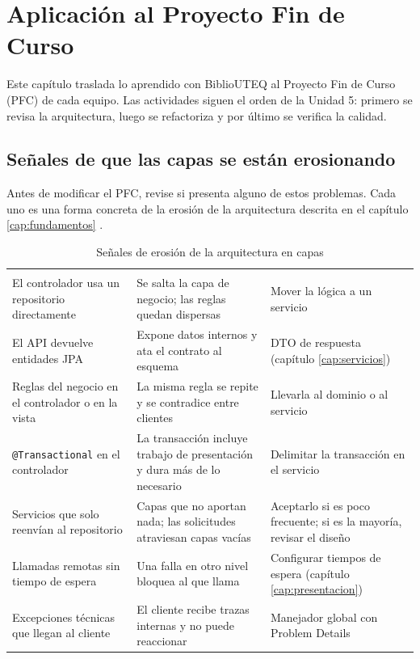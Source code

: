 \chapter{Aplicación al Proyecto Fin de Curso}\label{cap:actividades}

Este capítulo traslada lo aprendido con BiblioUTEQ al Proyecto Fin de Curso (PFC) de cada equipo. Las actividades siguen el orden de la Unidad 5: primero se revisa la arquitectura, luego se refactoriza y por último se verifica la calidad.

\section{Señales de que las capas se están erosionando}

Antes de modificar el PFC, revise si presenta alguno de estos problemas. Cada uno es una forma concreta de la erosión de la arquitectura descrita en el capítulo \ref{cap:fundamentos} \cite{li2022understanding}.

\begin{xltabular}{\linewidth}{@{}L{4.2cm}YL{4.3cm}@{}}
	\caption{Señales de erosión de la arquitectura en capas}\label{tab:erosion}\\
	\toprule
	 &  &  \\
	\midrule
	\endfirsthead
	\toprule
	 &  &  \\
	\midrule
	\endhead
	El controlador usa un repositorio directamente & Se salta la capa de negocio; las reglas quedan dispersas & Mover la lógica a un servicio \\
	\addlinespace
	El API devuelve entidades JPA & Expone datos internos y ata el contrato al esquema & DTO de respuesta (capítulo \ref{cap:servicios}) \\
	\addlinespace
	Reglas del negocio en el controlador o en la vista & La misma regla se repite y se contradice entre clientes & Llevarla al dominio o al servicio \\
	\addlinespace
	\texttt{@Transactional} en el controlador & La transacción incluye trabajo de presentación y dura más de lo necesario & Delimitar la transacción en el servicio \\
	\addlinespace
	Servicios que solo reenvían al repositorio & Capas que no aportan nada; las solicitudes atraviesan capas vacías \cite{richards2025fundamentals} & Aceptarlo si es poco frecuente; si es la mayoría, revisar el diseño \\
	\addlinespace
	Llamadas remotas sin tiempo de espera & Una falla en otro nivel bloquea al que llama & Configurar tiempos de espera (capítulo \ref{cap:presentacion}) \\
	\addlinespace
	Excepciones técnicas que llegan al cliente & El cliente recibe trazas internas y no puede reaccionar & Manejador global con Problem Details \\
	\bottomrule
\end{xltabular}

